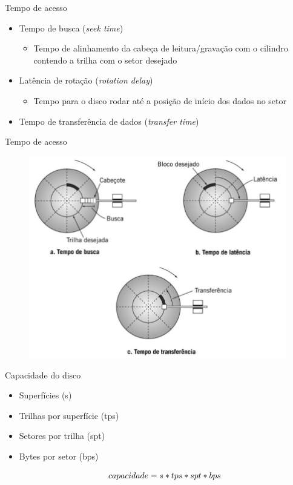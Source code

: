 \documentclass[aspectratio=169,
				xcolor=table]{beamer}
\begin{document}
	\begin{frame}{Tempo de acesso}
		\begin{itemize}
			\item Tempo de busca (\textit{seek time})
			\begin{itemize}
				\item Tempo de alinhamento da cabeça de leitura/gravação com o cilindro contendo a trilha com o setor desejado
			\end{itemize}
			\vspace{1em}
			\item Latência de rotação (\textit{rotation delay})
			\begin{itemize}
				\item Tempo para o disco rodar até a posição de início dos dados no setor
			\end{itemize}
			\vspace{1em}
			\item Tempo de transferência de dados (\textit{transfer time})
		\end{itemize}
	\end{frame}
	
	\begin{frame}{Tempo de acesso}
		\begin{figure}
		\centering
		\includegraphics[height=0.8\textheight, keepaspectratio]{../figs/cap08/disktime}
		\end{figure}			
	\end{frame}
	
	\begin{frame}{Capacidade do disco}
		\begin{itemize}
			\item Superfícies (s)
			\item Trilhas por superfície (tps)
			\item Setores por trilha (spt)
			\item Bytes por setor (bps)
			
			\begin{equation*}
				\Huge
				capacidade = s * tps * spt * bps
			\end{equation*}
		\end{itemize}
	\end{frame}
	
\end{document}
